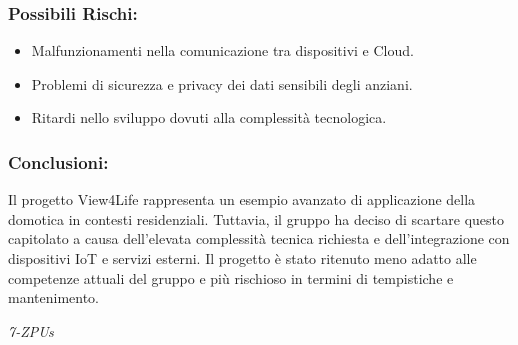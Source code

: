 \documentclass[a4paper,12pt]{article}
\begin{document}
\subsubsection*{Possibili Rischi:}
\begin{itemize}
    \item Malfunzionamenti nella comunicazione tra dispositivi e Cloud.
    \item Problemi di sicurezza e privacy dei dati sensibili degli anziani.
    \item Ritardi nello sviluppo dovuti alla complessità tecnologica.
\end{itemize}

\subsubsection*{Conclusioni:}
Il progetto View4Life rappresenta un esempio avanzato di applicazione della domotica in contesti residenziali. Tuttavia, il gruppo ha deciso di scartare questo capitolato a causa dell’elevata complessità tecnica richiesta e dell’integrazione con dispositivi IoT e servizi esterni. Il progetto è stato ritenuto meno adatto alle competenze attuali del gruppo e più rischioso in termini di tempistiche e mantenimento.


\vspace{0.5cm}

\vfill
\begin{flushright}
    \textit{7-ZPUs}
\end{flushright}
\end{document}

